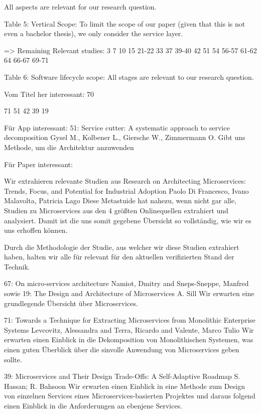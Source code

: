 \documentclass{article}
\begin{document}
    All aspects are relevant for our research question.


Table 5: Vertical Scope:
    To limit the scope of our paper (given that this is not even a bachelor thesis), we only consider the service layer.

=> Remaining Relevant studies:
    3
    7
    10
    15
    21-22
    33
    37
    39-40
    42
    51
    54
    56-57
    61-62
    64
    66-67
    69-71

Table 6: Software lifecycle scope:
    All stages are relevant to our research question.



Vom Titel her interessant:
    70

    71
    51
    42
    39
    19

Für App interessant:
51: Service cutter: A systematic approach to service decomposition
  Gysel M., Kolbener L., Giersche W., Zimmermann O.
Gibt uns Methode, um die Architektur anzuwenden

Für Paper interessant:

Wir extrahieren relevante Studien aus
Research on Architecting Microservices: Trends, Focus, and Potential for Industrial Adoption
  Paolo Di Francesco, Ivano Malavolta, Patricia Lago
Diese Metastuide hat nahezu, wenn nicht gar alle, Studien zu Microservices aus den 4 größten Onlinequellen extrahiert und analysiert. Damit ist die uns somit gegebene Übersicht so vollständig, wie wir es uns erhoffen können.

Durch die Methodologie der Studie, aus welcher wir diese Studien extrahiert haben, halten wir alle für relevant für den aktuellen verifizierten Stand der Technik.

67: On micro-services architecture
  Namiot, Dmitry and Sneps-Sneppe, Manfred
  sowie
19: The Design and Architecture of Microservices
  A. Sill
Wir erwarten eine grundlegende Übersicht über Microservices.

71: Towards a Technique for Extracting Microservices from Monolithic Enterprise Systems
    Levcovitz, Alessandra and Terra, Ricardo and Valente, Marco Tulio
Wir erwarten einen Einblick in die Dekomposition von Monolithischen Systemen, was einen guten Überblick über die sinvolle Anwendung von Microservices geben sollte.

39: Microservices and Their Design Trade-Offs: A Self-Adaptive Roadmap
  S. Hassan; R. Bahsoon
Wir erwarten einen Einblick in eine Methode zum Design von einzelnen Services eines Microservices-basierten Projektes und daraus folgend einen Einblick in die Anforderungen an ebenjene Services.
\end{document}
